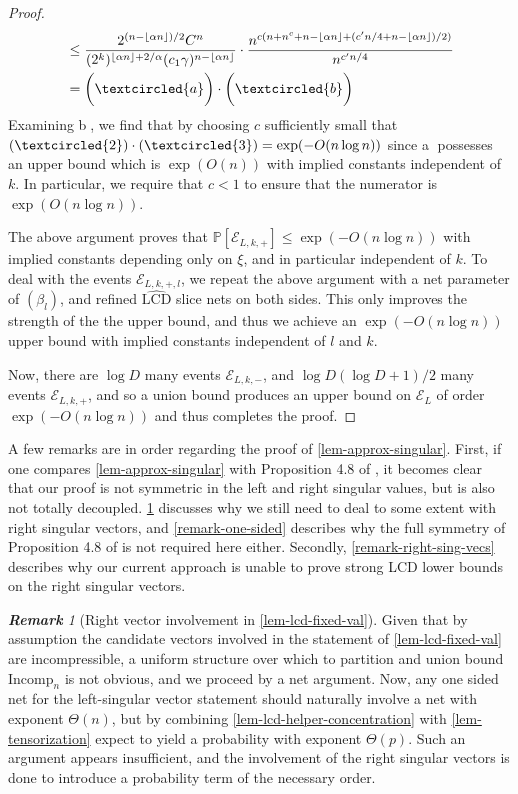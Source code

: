 \documentclass[11pt]{article}
\numberwithin{equation}{section}
\theoremstyle{remark}
\newtheorem{remark}{\bf Remark}[section]
\newcommand{\Incomp}{\mathrm{Incomp}}
\newcommand{\rLCD}{\widehat{\mathrm{LCD}}}
\newcommand{\event}{\mathcal{E}}
\begin{document}
\begin{proof}
\begin{align*}
        &\leq \frac{2^{(n - \lfloor \alpha n \rfloor)/2}C^n}{(2^k)^{\lfloor \alpha n \rfloor + 2/\alpha}(c_1\gamma)^{n - \lfloor \alpha n \rfloor}}  \cdot \frac{n^{c(n + n^c + n - \lfloor \alpha n \rfloor + (c'n/4 + n - \lfloor \alpha n \rfloor)/2)}}{n^{c'n/4}} \\
        &= \bigg(\textcircled{a} \bigg) \cdot \bigg(\textcircled{b} \bigg)
    \end{align*}
    Examining \textcircled{b}, we find that by choosing $c$ sufficiently small that $(\textcircled{2}) \cdot (\textcircled{3}) = \exp(-O(n \log n))$ since \textcircled{a} possesses an upper bound which is $\exp(O(n))$ with implied constants independent of $k$. In particular, we require that $c < 1$ to ensure that the numerator is $\exp(O(n \log n))$.

    The above argument proves that $\mathbb{P}[\event_{L, k, +}] \leq \exp(-O(n \log n))$ with implied constants depending only on $\xi$, and in particular independent of $k$. To deal with the events $\event_{L, k, +, l}$, we repeat the above argument with a net parameter of $(\beta_l)$, and refined $\rLCD$ slice nets on both sides. This only improves the strength of the the upper bound, and thus we achieve an $\exp(-O(n \log n))$ upper bound with implied constants independent of $l$ and $k$. 

    Now, there are $\log D$ many events $\event_{L, k, -}$, and $\log D(\log D + 1)/2$ many events $\event_{L, k, +}$, and so a union bound produces an upper bound on $\event_L$ of order $\exp(-O(n\log n))$ and thus completes the proof.
\end{proof}

A few remarks are in order regarding the proof of \cref{lem-approx-singular}. First, if one compares \cref{lem-approx-singular} with Proposition 4.8 of \cite{christoffersen2025gaps}, it becomes clear that our proof is not symmetric in the left and right singular values, but is also not totally decoupled. \cref{remark-two-sided} discusses why we still need to deal to some extent with right singular vectors, and \cref{remark-one-sided} describes why the full symmetry of Proposition 4.8 of \cite{christoffersen2025gaps} is not required here either. Secondly, \cref{remark-right-sing-vecs} describes why our current approach is unable to prove strong LCD lower bounds on the right singular vectors.

\begin{remark}[Right vector involvement in \cref{lem-lcd-fixed-val}]\label{remark-two-sided}
    Given that by assumption the candidate vectors involved in the statement of \cref{lem-lcd-fixed-val} are incompressible, a uniform structure over which to partition and union bound $\Incomp_n$ is not obvious, and we proceed by a net argument. Now, any one sided net for the left-singular vector statement should naturally involve a net with exponent $\Theta(n)$, but by combining \cref{lem-lcd-helper-concentration} with \cref{lem-tensorization} expect to yield a probability with exponent $\Theta(p)$. Such an argument appears insufficient, and the involvement of the right singular vectors is done to introduce a probability term of the necessary order.
\end{remark}
\end{document}
